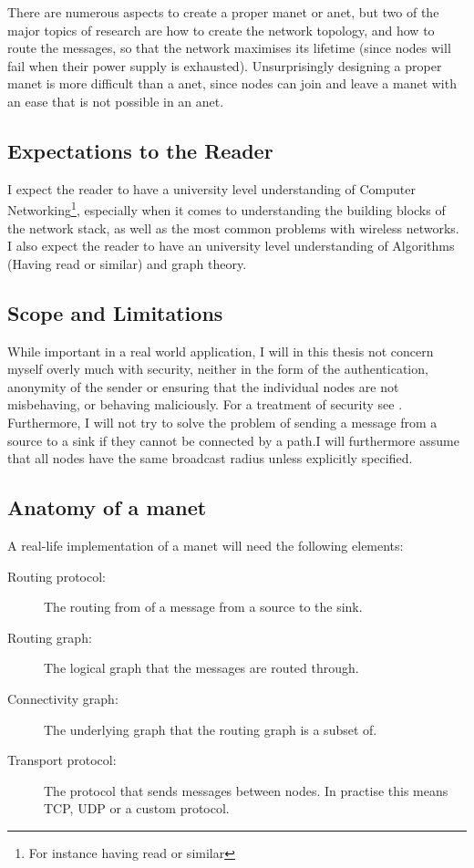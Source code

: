There are numerous aspects to create a proper \ac{manet} or \ac{anet}, but two of the major topics of research are how to create the network topology, and how to route the messages, so that the network maximises its lifetime (since nodes will fail when their power supply is exhausted). Unsurprisingly designing a proper \ac{manet} is more difficult than a \ac{anet}, since nodes can join and leave a \ac{manet} with an ease that is not possible in an \ac{anet}. 

\subsection{Expectations to the Reader}
I expect the reader to have a university level understanding of Computer Networking\footnote{For instance having read \cite{ComNet} or similar}, especially when it comes to understanding the building blocks of the network stack, as well as the most common problems with wireless networks. I also expect the reader to have an university level understanding of Algorithms (Having read \cite{algo} or similar) and graph theory.

\subsection{Scope and Limitations}
While important in a real world application, I will in this thesis not concern myself overly much with security, neither in the form of the authentication, anonymity of the sender or ensuring that the individual nodes are not misbehaving, or behaving maliciously. For a treatment of security see \cite{trustedRouting}. Furthermore, I will not try to solve the problem of sending a message from a source to a sink if they cannot be connected by a path.I will furthermore assume that all nodes have the same broadcast radius unless explicitly specified.

\subsection{Anatomy of a \ac{manet}}
A real-life implementation of a \ac{manet} will need the following elements:
\begin{description}
\item[Routing protocol:] The routing from of a message from a source to the sink.
\item[Routing graph:] The logical graph that the messages are routed through.
\item[Connectivity graph:] The underlying graph that the routing graph is a subset of.
\item[Transport protocol:] The protocol that sends messages between nodes. In practise this means TCP, UDP or a custom protocol.
\end{description}


